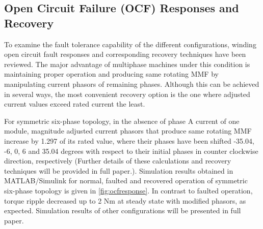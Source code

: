 \documentclass[a4paper,11pt]{article}
\begin{document}
\subsection{\normalsize\textbf{Open Circuit Failure (OCF) Responses and Recovery}}

To examine the fault tolerance capability of the different configurations, winding open circuit fault responses and corresponding recovery techniques have been reviewed. The major advantage of multiphase machines under this condition is maintaining proper operation and producing same rotating MMF by manipulating current phasors of remaining phases. Although this can be achieved in several ways, the most convenient recovery option is the one where adjusted current values exceed rated current the least.\par
For symmetric six-phase topology, in the absence of phase A current of one module, magnitude adjusted current phasors that produce same rotating MMF increase by 1.297 of its rated value, where their phases have been shifted -35.04, -6, 0, 6 and 35.04 degrees with respect to their initial phases in counter clockwise direction, respectively \cite{recover} (Further details of these calculations and recovery techniques will be provided in full paper.). Simulation results obtained in MATLAB/Simulink for normal, faulted and recovered operation of symmetric six-phase topology is given in \ref{fig:ocfresponse}. In contrast to faulted operation, torque ripple decreased up to 2 Nm at steady state with modified phasors, as expected. Simulation results of other configurations will be presented in full paper.
\end{document}
